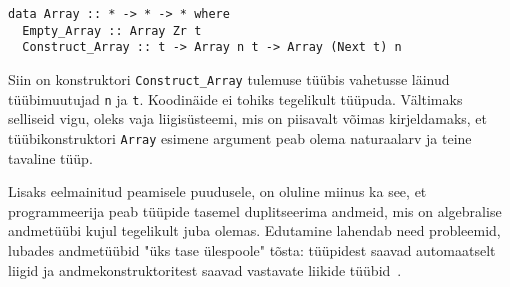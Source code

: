 \documentclass[12pt]{article}
\begin{document}
      \begin{verbatim}data Array :: * -> * -> * where
  Empty_Array :: Array Zr t
  Construct_Array :: t -> Array n t -> Array (Next t) n\end{verbatim}

      Siin on konstruktori \verb!Construct_Array! tulemuse tüübis vahetusse läinud tüübimuutujad \verb!n! ja \verb!t!. Koodinäide ei tohiks tegelikult tüüpuda. Vältimaks selliseid vigu, oleks vaja liigisüsteemi, mis on piisavalt võimas kirjeldamaks, et tüübikonstruktori \verb!Array! esimene argument peab olema naturaalarv ja teine tavaline tüüp.

      Lisaks eelmainitud peamisele puudusele, on oluline miinus ka see, et programmeerija peab tüüpide tasemel duplitseerima andmeid, mis on algebralise andmetüübi kujul tegelikult juba olemas. Edutamine lahendab need probleemid, lubades andmetüübid "üks tase ülespoole" tõsta: tüüpidest saavad automaatselt liigid ja andmekonstruktoritest saavad vastavate liikide tüübid~\cite{Giv}.
\end{document}
